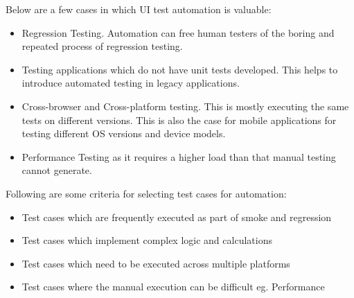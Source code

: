 Below are a few cases in which UI test automation is valuable:
\begin{itemize}
	\item Regression Testing. Automation can free human testers of the boring and repeated process of regression testing.
	\item Testing applications which do not have unit tests developed. This helps to introduce automated testing in legacy applications.
	\item Cross-browser and Cross-platform testing. This is mostly executing the same tests on different versions. This is also the case for mobile applications for testing different OS versions and device models.
	\item Performance Testing as it requires a higher load than that manual testing cannot generate.

\end{itemize}
Following are some criteria for selecting test cases for automation:
\begin{itemize}
	\item Test cases which are frequently executed as part of smoke and regression
	\item Test cases which implement complex logic and calculations
	\item Test cases which need to be executed across multiple platforms
	\item Test cases where the manual execution can be difficult eg. Performance
\end{itemize}